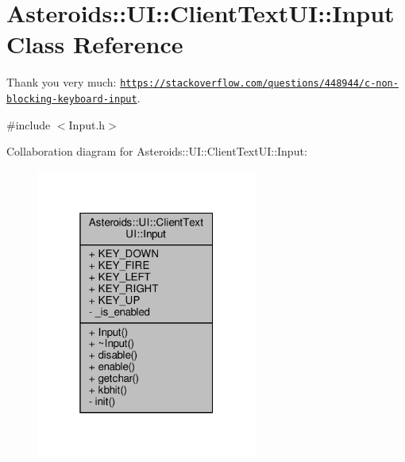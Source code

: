 \hypertarget{classAsteroids_1_1UI_1_1ClientTextUI_1_1Input}{}\section{Asteroids\+:\+:UI\+:\+:Client\+Text\+UI\+:\+:Input Class Reference}
\label{classAsteroids_1_1UI_1_1ClientTextUI_1_1Input}


Thank you very much\+: \href{https://stackoverflow.com/questions/448944/c-non-blocking-keyboard-input}{\tt https\+://stackoverflow.\+com/questions/448944/c-\/non-\/blocking-\/keyboard-\/input}.  




{\ttfamily \#include $<$Input.\+h$>$}



Collaboration diagram for Asteroids\+:\+:UI\+:\+:Client\+Text\+UI\+:\+:Input\+:\nopagebreak
\begin{figure}[H]
\begin{center}
\leavevmode
\includegraphics[width=205pt]{classAsteroids_1_1UI_1_1ClientTextUI_1_1Input__coll__graph}
\end{center}
\end{figure}
